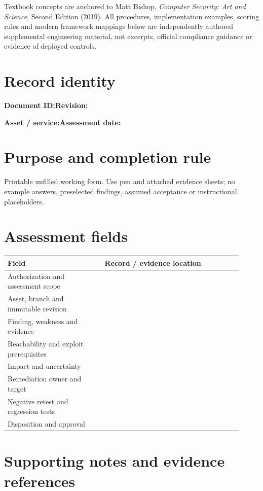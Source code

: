 \documentclass[10pt,letterpaper]{article}
\begin{document}
\makedoctocpage
\begin{notebox}
Textbook concepts are anchored to Matt Bishop, \emph{Computer Security: Art and Science}, Second Edition (2019). All procedures, implementation examples, scoring rules and modern framework mappings below are independently authored supplemental engineering material, not excerpts, official compliance guidance or evidence of deployed controls.
\end{notebox}
\section{Record identity}
\textbf{Document ID:}\enspace\hrulefill\quad\textbf{Revision:}\enspace\hrulefill
\par\medskip\textbf{Asset / service:}\enspace\hrulefill\quad\textbf{Assessment date:}\enspace\hrulefill
\section{Purpose and completion rule}
Printable unfilled working form. Use pen and attached evidence sheets; no example answers, preselected findings, assumed acceptance or instructional placeholders.
\section{Assessment fields}
\renewcommand{\arraystretch}{1.8}
\begin{longtable}{@{}p{0.38\linewidth}p{0.54\linewidth}@{}}
\toprule\textbf{Field}&\textbf{Record / evidence location}\\\midrule\endhead
Authorization and assessment scope & \rule{0pt}{1.3cm}\\\midrule
Asset, branch and immutable revision & \rule{0pt}{1.3cm}\\\midrule
Finding, weakness and evidence & \rule{0pt}{1.3cm}\\\midrule
Reachability and exploit prerequisites & \rule{0pt}{1.3cm}\\\midrule
Impact and uncertainty & \rule{0pt}{1.3cm}\\\midrule
Remediation owner and target & \rule{0pt}{1.3cm}\\\midrule
Negative retest and regression tests & \rule{0pt}{1.3cm}\\\midrule
Disposition and approval & \rule{0pt}{1.3cm}\\\midrule
\bottomrule\end{longtable}
\section{Supporting notes and evidence references}
\end{document}
